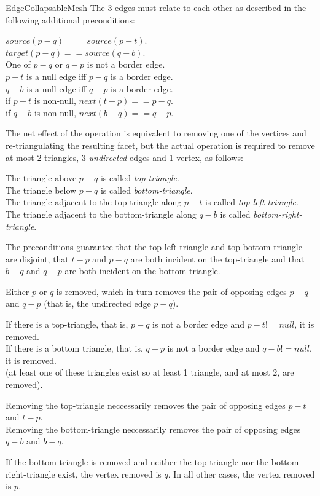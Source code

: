 \begin{ccRefConcept}{EdgeCollapsableMesh}
The 3 edges must relate to each other as described in the following additional preconditions:

$source(p-q)==source(p-t)$.\\
$target(p-q)==source(q-b)$.\\
One of $p-q$ or $q-p$ is not a border edge.\\
$p-t$ is a null edge iff $p-q$ is a border edge.\\
$q-b$ is a null edge iff $q-p$ is a border edge.\\
if $p-t$ is non-null, $next(t-p)==p-q$.\\
if $q-b$ is non-null, $next(b-q)==q-p$.

The net effect of the operation is equivalent to removing one of the vertices
and re-triangulating the resulting facet, but the actual operation is 
required to remove at most 2 triangles, 3 {\em undirected} edges and 1 vertex, 
as follows:

The triangle above $p-q$ is called {\em top-triangle}.\\
The triangle below $p-q$ is called {\em bottom-triangle}.\\
The triangle adjacent to the top-triangle along $p-t$ is called {\em top-left-triangle}.\\
The triangle adjacent to the bottom-triangle along $q-b$ is called {\em bottom-right-triangle}.

The preconditions guarantee that the top-left-triangle and top-bottom-triangle
are disjoint, that $t-p$ and $p-q$ are both incident on the top-triangle and that
$b-q$ and $q-p$ are both incident on the bottom-triangle.
      
Either $p$ or $q$ is removed, which in turn removes the pair of opposing edges 
$p-q$ and $q-p$ (that is, the undirected edge $p-q$).

If there is a top-triangle, that is, $p-q$ is not a border edge and $p-t!=null$, it is removed.\\
If there is a bottom triangle, that is, $q-p$ is not a border edge and $q-b!=null$, it is removed.\\
(at least one of these triangles exist so at least 1 triangle, and at most 2, are removed).
  
Removing the top-triangle neccessarily removes the pair of opposing edges $p-t$ and $t-p$.\\
Removing the bottom-triangle neccessarily removes the pair of opposing edges $q-b$ and $b-q$.
      
If the bottom-triangle is removed and neither the top-triangle nor
the bottom-right-triangle exist, the vertex removed is $q$. In all other
cases, the vertex removed is $p$.


\end{ccRefConcept}
